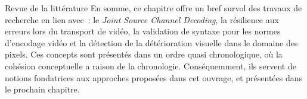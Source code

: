 \documentclass[letterpaper, twoside, 12pt,memoire]{thETS}
\begin{document}
\begin{chapter}{Revue de la littérature}
En somme, ce chapitre offre un bref survol des travaux de recherche en lien
avec~: le \textit{Joint Source Channel Decoding}, la résilience aux erreurs lors
du transport de vidéo, la validation de syntaxe pour les normes d'encodage vidéo
et la détection de la détérioration visuelle dans le domaine des pixels. Ces
concepts sont présentés dans un ordre quasi chronologique, où la cohésion
conceptuelle a raison de la chronologie. Conséquemment, ils servent
de notions fondatrices aux approches proposées dans cet ouvrage, et présentées
dans le prochain chapitre.


\end{chapter}



\end{document}
